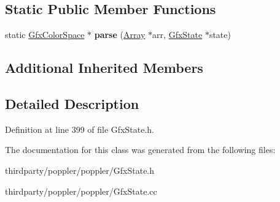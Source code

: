 \subsection*{Static Public Member Functions}
\begin{DoxyCompactItemize}
\item 
\mbox{\label{class_gfx_cal_r_g_b_color_space_a01bef4ba0bf301141a43fe3f07688689}} 
static \hyperlink{class_gfx_color_space}{Gfx\+Color\+Space} $\ast$ {\bfseries parse} (\hyperlink{class_array}{Array} $\ast$arr, \hyperlink{class_gfx_state}{Gfx\+State} $\ast$state)
\end{DoxyCompactItemize}
\subsection*{Additional Inherited Members}


\subsection{Detailed Description}


Definition at line 399 of file Gfx\+State.\+h.



The documentation for this class was generated from the following files\+:\begin{DoxyCompactItemize}
\item 
thirdparty/poppler/poppler/Gfx\+State.\+h\item 
thirdparty/poppler/poppler/Gfx\+State.\+cc\end{DoxyCompactItemize}
